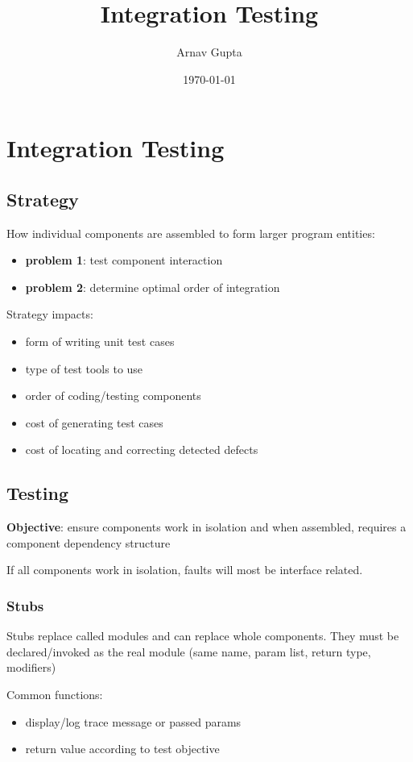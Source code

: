 \documentclass[11pt]{article}
\author{Arnav Gupta}
\date{\today}
\title{Integration Testing}
\begin{document}
\maketitle
\tableofcontents

\section{Integration Testing}
\label{sec:org561a1fc}
\subsection{Strategy}
\label{sec:org0c15665}
How individual components are assembled to form larger program entities:
\begin{itemize}
\item \textbf{problem 1}: test component interaction
\item \textbf{problem 2}: determine optimal order of integration
\end{itemize}

Strategy impacts:
\begin{itemize}
\item form of writing unit test cases
\item type of test tools to use
\item order of coding/testing components
\item cost of generating test cases
\item cost of locating and correcting detected defects
\end{itemize}
\subsection{Testing}
\label{sec:org8764c04}
\textbf{Objective}: ensure components work in isolation and when assembled, requires
a component dependency structure

If all components work in isolation, faults will most be interface related.
\subsubsection{Stubs}
\label{sec:orgcca9a9c}
Stubs replace called modules and can replace whole components.
They must be declared/invoked as the real module (same name, param list,
return type, modifiers)

Common functions:
\begin{itemize}
\item display/log trace message or passed params
\item return value according to test objective
\end{itemize}
\end{document}
